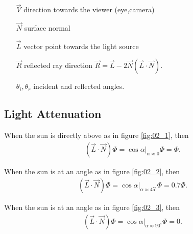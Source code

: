 \documentclass[10pt]{armath}
\numberwithin{equation}{section}
\newenvironment{Figure}
{\par\medskip\noindent\minipage{\linewidth}}
{\endminipage\par\medskip}
\theoremstyle{definition}
\begin{document}
\begin{multicols}{2}
  \begin{enumerate}
    \item[$\vec{V}$] direction towards the viewer (eye,camera)
    \item[$\vec{N}$] surface normal
    \item[$\vec{L}$] vector point towards the light source
    \item[$\vec{R}$] reflected ray direction
      $\vec{R}=\vec{L}-2\vec{N}\left(\vec{L}\cdot\vec{N}\right)$.
    \item[$\theta_i,\theta_r$] incident and reflected angles.
  \end{enumerate}

  \subsection{Light Attenuation}%
  \label{sub:light_attenuation}

  When the sun is directly above as in figure \ref{fig:02_1}, then
  \begin{align*}
    \left(\vec{L}\cdot\vec{N}\right)\Phi=\cos\alpha|_{\alpha\approx0}\Phi=\Phi.
  \end{align*}

  \begin{Figure}
    \begin{center}
      
    \end{center}
    \label{fig:02_2}
  \end{Figure}

  When the sun is at an angle as in figure \ref{fig:02_2}, then
  \begin{align*}
    \left(\vec{L}\cdot\vec{N}\right)\Phi=\cos\alpha|_{\alpha\approx45^\circ}\Phi=0.7\Phi.
  \end{align*}

  \begin{Figure}
    \begin{center}
      
    \end{center}
    \label{fig:02_3}
  \end{Figure}

  When the sun is at an angle as in figure \ref{fig:02_3}, then
  \begin{align*}
    \left(\vec{L}\cdot\vec{N}\right)\Phi=\cos\alpha|_{\alpha\approx90^\circ}\Phi=0.
  \end{align*}


\end{multicols}
\end{document}
